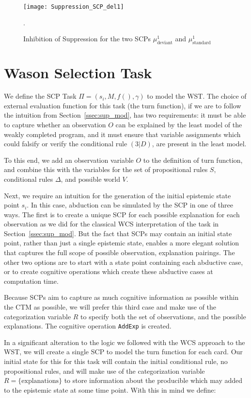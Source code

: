 \begin{figure}
\centering \texttt{[image: Suppression\_SCP\_del1]}
\caption{Inhibition of Suppression for the two SCPs $\mu^1_\text{deviant}$ and $\mu^1_\text{standard}$}.
\label{fig:Suppression_SCP_del1}
\end{figure}


\section{Wason Selection Task}\label{sec:wstSCP}

We define the SCP Task $\Pi=(s_i,M,f(),\gamma)$ to model the WST. The choice of external evaluation function for this task (the turn function), if we are to follow the intuition from Section~\ref{ssec:sup_mod}, has two requirements: it must be able to capture whether an observation $O$ can be explained by the least model of the weakly completed program, and it must ensure that variable assignments which could falsify or verify the conditional rule $(3|D)$, are present in the least model. 

To this end, we add an observation variable $O$ to the definition of turn function, and combine this with the variables for the set of propositional rules $S$, conditional rules $\Delta$, and possible world $V$.

Next, we require an intuition for the generation of the initial epistemic state point $s_i$. In this case, abduction can be simulated by the SCP in one of three ways. The first is to create a unique SCP for each possible explanation for each observation as we did for the classical WCS interpretation of the task in Section~\ref{ssec:sup_mod}. But the fact that SCPs may contain an initial state point, rather than just a single epistemic state, enables a more elegant solution that captures the full scope of possible observation, explanation pairings. The other two options are to start with a state point containing each abductive case, or to create cognitive operations which create these abductive cases at computation time.

Because SCPs aim to capture as much cognitive information as possible within the CTM as possible, we will prefer this third case and make use of the categorization variable $R$ to specify both the set of observations, and the possible explanations. The cognitive operation \texttt{AddExp} is created.

In a significant alteration to the logic we followed with the WCS approach to the WST, we will create a single SCP to model the turn function for each card. Our initial state for this for this task will contain the initial conditional rule, no propositional rules, and will make use of the categorization variable $R=\{\text{explanations}\}$ to store information about the producible which may added to the epistemic state at some time point. With this in mind we define:

